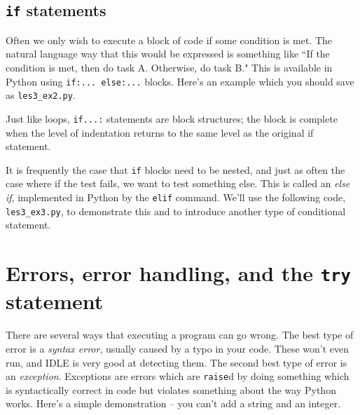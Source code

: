 \documentclass[m3380-lec-main.tex]{subfiles}
\begin{document}
\smallskip\noindent

\subsection{\texttt{if} statements} Often we only wish to execute a block of code if some condition is met. The natural language way that this would be expressed is something like ``If the condition is met, then do task A. Otherwise, do task B." This is available in Python using \verb|if:... else:...| blocks. Here's an example which you should save as \verb|les3_ex2.py|.

\smallskip\noindent
Just like loops, \verb|if...:| statements are block structures; the block is complete when the level of indentation returns to the same level as the original if statement.

It is frequently the case that \verb|if| blocks need to be nested, and just as often the case where if the test fails, we want to test something else. This is called an \emph{else if}, implemented in Python by the \verb|elif| command. We'll use the following code, \verb|les3_ex3.py|, to demonstrate this and to introduce another type of conditional statement.

\smallskip\noindent

\section{Errors, error handling, and the \texttt{try} statement}
There are several ways that executing a program can go wrong. The best type of error is a \emph{syntax error}, usually caused by a typo in your code. These won't even run, and IDLE is very good at detecting them. The second best type of error is an \emph{exception}. Exceptions are errors which are \verb|raise|d by doing something which is syntactically correct in code but violates something about the way Python works. Here's a simple demonstration -- you can't add a string and an integer.
\end{document}
